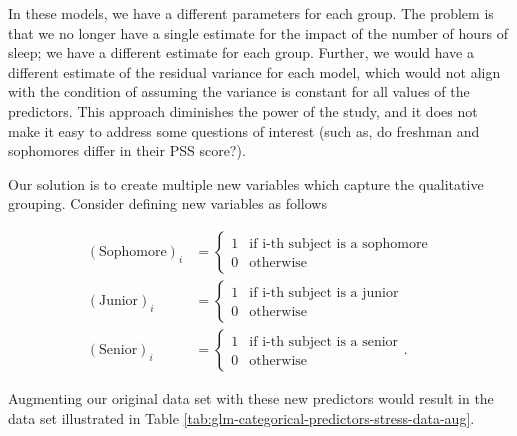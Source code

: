 \documentclass[
]{book}
\theoremstyle{plain}
\theoremstyle{mydefn}
\theoremstyle{myexmpl}
\theoremstyle{remark}
\begin{document}
In these models, we have a different parameters for each group. The problem is that we no longer have a single estimate for the impact of the number of hours of sleep; we have a different estimate for each group. Further, we would have a different estimate of the residual variance for each model, which would not align with the condition of assuming the variance is constant for all values of the predictors. This approach diminishes the power of the study, and it does not make it easy to address some questions of interest (such as, do freshman and sophomores differ in their PSS score?).

Our solution is to create multiple new variables which capture the qualitative grouping. Consider defining new variables as follows

\[
\begin{aligned}
  (\text{Sophomore})_i &= \begin{cases}
    1 & \text{if i-th subject is a sophomore} \\
    0 & \text{otherwise}
    \end{cases} \\
  (\text{Junior})_i &= \begin{cases}
    1 & \text{if i-th subject is a junior} \\
    0 & \text{otherwise}
    \end{cases} \\
  (\text{Senior})_i &= \begin{cases}
    1 & \text{if i-th subject is a senior} \\
    0 & \text{otherwise}
    \end{cases}.
\end{aligned}
\]

Augmenting our original data set with these new predictors would result in the data set illustrated in Table \ref{tab:glm-categorical-predictors-stress-data-aug}.
\end{document}
